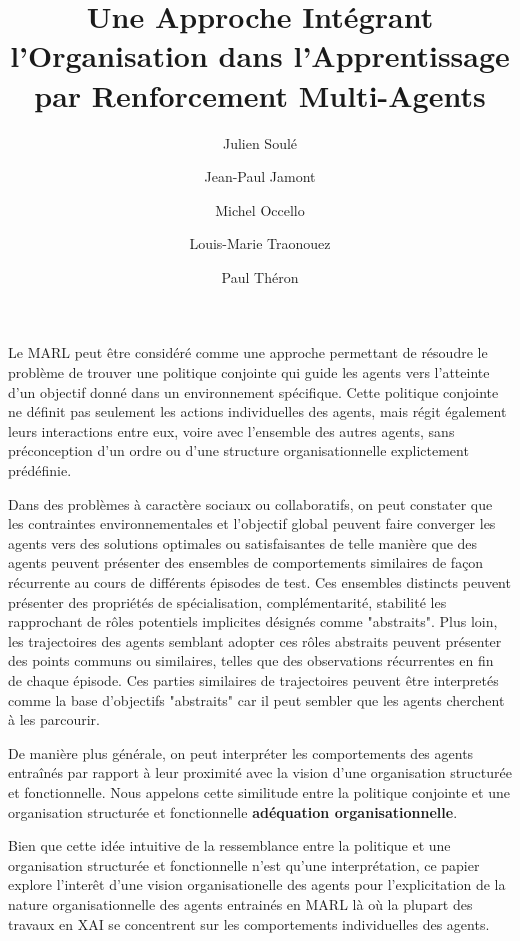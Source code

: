 \documentclass[sigconf,anonymous]{aamas}
\title[AAMAS-2025 CybMASDE]{Une Approche Intégrant l'Organisation dans l'Apprentissage par Renforcement Multi-Agents}
\author{Julien Soulé}
\affiliation{
  \institution{Univ. Grenoble Alpes}
  \city{Valence}
  \country{France}}
\author{Jean-Paul Jamont}
\affiliation{
  \institution{Univ. Grenoble Alpes}
  \city{Valence}
  \country{France}}
\author{Michel Occello}
\affiliation{
  \institution{Univ. Grenoble Alpes}
  \city{Valence}
  \country{France}}
\author{Louis-Marie Traonouez}
\affiliation{
  \institution{Thales Land and Air Systems, BU IAS}
  \city{Rennes}
  \country{France}}
\author{Paul Théron}
\affiliation{
  \institution{AICA IWG}
  \city{La Guillermie}
  \country{France}}
\begin{document}

\pagestyle{fancy}
\fancyhead{}


\maketitle



Le MARL peut être considéré comme une approche permettant de résoudre le problème de trouver une politique conjointe qui guide les agents vers l'atteinte d'un objectif donné dans un environnement spécifique.
Cette politique conjointe ne définit pas seulement les actions individuelles des agents, mais régit également leurs interactions entre eux, voire avec l'ensemble des autres agents, sans préconception d'un ordre ou d'une structure organisationnelle explictement prédéfinie.

Dans des problèmes à caractère sociaux ou collaboratifs, on peut constater que les contraintes environnementales et l'objectif global peuvent faire converger les agents vers des solutions optimales ou satisfaisantes de telle manière que des agents peuvent présenter des ensembles de comportements similaires de façon récurrente au cours de différents épisodes de test. Ces ensembles distincts peuvent présenter des propriétés de spécialisation, complémentarité, stabilité les rapprochant de rôles potentiels implicites désignés comme "abstraits". Plus loin, les trajectoires des agents semblant adopter ces rôles abstraits peuvent présenter des points communs ou similaires, telles que des observations récurrentes en fin de chaque épisode. Ces parties similaires de trajectoires peuvent être interpretés comme la base d'objectifs "abstraits" car il peut sembler que les agents cherchent à les parcourir.

De manière plus générale, on peut interpréter les comportements des agents entraînés par rapport à leur proximité avec la vision d'une organisation structurée et fonctionnelle. Nous appelons cette similitude entre la politique conjointe et une organisation structurée et fonctionnelle \textbf{adéquation organisationnelle}.

Bien que cette idée intuitive de la ressemblance entre la politique et une organisation structurée et fonctionnelle n'est qu'une interprétation, ce papier explore l'interêt d'une vision organisationelle des agents pour l'explicitation de la nature organisationnelle des agents entrainés en MARL là où la plupart des travaux en XAI se concentrent sur les comportements individuelles des agents.
\end{document}
